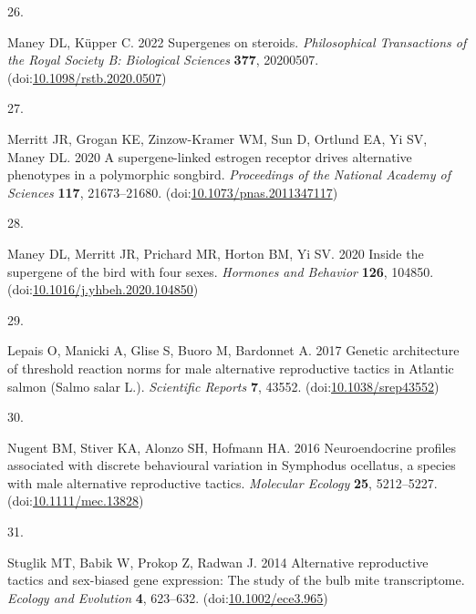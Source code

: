 \documentclass[
  11pt,
  a4paper,
]{article}
\newlength{\cslhangindent}
\newlength{\csllabelwidth}
\newlength{\cslentryspacingunit} %
\newenvironment{CSLReferences}[2] %
 {%
  \setlength{\parindent}{0pt}
  \ifodd #1
  \let\oldpar\par
  \def\par{\hangindent=\cslhangindent\oldpar}
  \fi
  \setlength{\parskip}{#2\cslentryspacingunit}
 }%
 {}
\newcommand{\CSLLeftMargin}[1]{\parbox[t]{\csllabelwidth}{#1}}
\newcommand{\CSLRightInline}[1]{\parbox[t]{\linewidth - \csllabelwidth}{#1}\break}
\begin{document}
\begin{CSLReferences}{0}{0}
\leavevmode{}%
\CSLLeftMargin{26. }%
\CSLRightInline{Maney DL, Küpper C. 2022 Supergenes on steroids. \emph{Philosophical Transactions of the Royal Society B: Biological Sciences} \textbf{377}, 20200507. (doi:\href{https://doi.org/10.1098/rstb.2020.0507}{10.1098/rstb.2020.0507})}

\leavevmode{}%
\CSLLeftMargin{27. }%
\CSLRightInline{Merritt JR, Grogan KE, Zinzow-Kramer WM, Sun D, Ortlund EA, Yi SV, Maney DL. 2020 A supergene-linked estrogen receptor drives alternative phenotypes in a polymorphic songbird. \emph{Proceedings of the National Academy of Sciences} \textbf{117}, 21673--21680. (doi:\href{https://doi.org/10.1073/pnas.2011347117}{10.1073/pnas.2011347117})}

\leavevmode{}%
\CSLLeftMargin{28. }%
\CSLRightInline{Maney DL, Merritt JR, Prichard MR, Horton BM, Yi SV. 2020 Inside the supergene of the bird with four sexes. \emph{Hormones and Behavior} \textbf{126}, 104850. (doi:\href{https://doi.org/10.1016/j.yhbeh.2020.104850}{10.1016/j.yhbeh.2020.104850})}

\leavevmode{}%
\CSLLeftMargin{29. }%
\CSLRightInline{Lepais O, Manicki A, Glise S, Buoro M, Bardonnet A. 2017 Genetic architecture of threshold reaction norms for male alternative reproductive tactics in {Atlantic} salmon ({Salmo} salar {L}.). \emph{Scientific Reports} \textbf{7}, 43552. (doi:\href{https://doi.org/10.1038/srep43552}{10.1038/srep43552})}

\leavevmode{}%
\CSLLeftMargin{30. }%
\CSLRightInline{Nugent BM, Stiver KA, Alonzo SH, Hofmann HA. 2016 Neuroendocrine profiles associated with discrete behavioural variation in {Symphodus} ocellatus, a species with male alternative reproductive tactics. \emph{Molecular Ecology} \textbf{25}, 5212--5227. (doi:\href{https://doi.org/10.1111/mec.13828}{10.1111/mec.13828})}

\leavevmode{}%
\CSLLeftMargin{31. }%
\CSLRightInline{Stuglik MT, Babik W, Prokop Z, Radwan J. 2014 Alternative reproductive tactics and sex-biased gene expression: The study of the bulb mite transcriptome. \emph{Ecology and Evolution} \textbf{4}, 623--632. (doi:\href{https://doi.org/10.1002/ece3.965}{10.1002/ece3.965})}


\end{CSLReferences}
\end{document}
